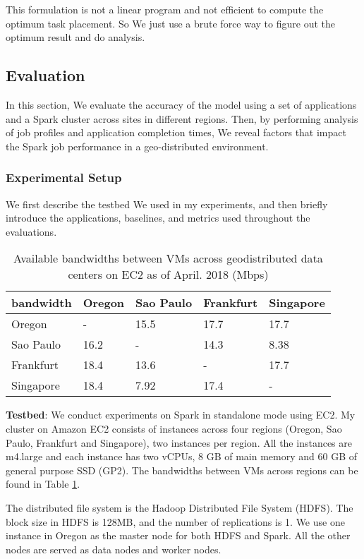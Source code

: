 \documentclass[base.tex]{subfiles}
\begin{document}
This formulation is not a linear program and not efficient to compute the optimum task placement. So We just use a brute force way to figure out the optimum result and do analysis.


\subsection{Evaluation}
In this section, We evaluate the accuracy of the model using a set of applications and a Spark cluster across sites in different regions. Then, by performing analysis of job profiles and application completion times, We reveal factors that impact the Spark job performance in a geo-distributed environment.
\subsubsection{Experimental Setup}

We first describe the testbed We used in my experiments, and then briefly introduce the applications, baselines, and metrics used throughout the evaluations.
\begin{table}[htbp]
\centering
\caption{Available bandwidths between VMs across geodistributed data centers on EC2 as of April. 2018 (Mbps)}
\label{Table of bandwidth}
\begin{tabular}{|l|l|l|l|l|}
\hline
bandwidth & Oregon & Sao Paulo & Frankfurt & Singapore \\ \hline
Oregon    & -      & 15.5 & 17.7      & 17.7      \\ \hline
Sao Paulo & 16.2   & -    & 14.3      & 8.38      \\ \hline
Frankfurt & 18.4   & 13.6 & -         & 17.7      \\ \hline
Singapore & 18.4   & 7.92 & 17.4      & -         \\ \hline
\end{tabular}
\end{table}

\textbf{Testbed}: We conduct experiments on Spark in standalone mode using EC2. My cluster on Amazon EC2 consists of instances across four regions (Oregon, Sao Paulo, Frankfurt and Singapore), two instances per region. All the instances are m4.large and each instance has two vCPUs, 8 GB of main memory and 60 GB of general purpose SSD (GP2). The bandwidths between VMs across regions can be found in Table \ref{Table of bandwidth}.

The distributed file system is the Hadoop Distributed File System (HDFS). The block size in HDFS is 128MB, and the number of replications is 1. We use one instance in Oregon as the master node for both HDFS and Spark. All the other nodes are served as data nodes and worker nodes.
\end{document}
